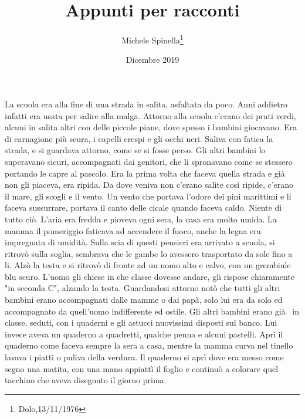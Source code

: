 \documentclass[12pt, a4paper]{article}
\author{Michele Spinella\thanks{Dolo,13/11/1976}}
\date{Dicembre 2019}
\title{Appunti per racconti}
\begin{document}
\ttfamily
\onehalfspacing


\section*{}
La scuola era alla fine di una strada in salita, asfaltata da poco. Anni addietro infatti era usata per salire alla malga. Attorno alla scuola c'erano dei prati verdi, alcuni in salita  altri con delle piccole piane, dove spesso i bambini giocavano.
Era di carnagione più scura, i capelli crespi e gli occhi neri. Saliva con fatica la strada, e si guardava attorno, come se si fosse perso. Gli altri bambini lo superavano sicuri, accompagnati dai genitori, che li spronavano  come se stessero portando le capre al pascolo.
Era la prima volta che faceva quella strada e già non gli piaceva, era ripida.
Da dove veniva non c'erano salite così ripide, c'erano il mare, gli scogli e il vento. Un vento che portava l'odore dei pini marittimi e li faceva sussurrare, portava il canto delle cicale quando faceva caldo.
Niente di tutto ciò. L'aria era fredda e pioveva ogni sera, la casa era molto umida. La mamma il pomeriggio faticava ad accendere il fuoco, anche la legna era impregnata di umidità.
\newline
Sulla scia di questi pensieri era arrivato a scuola, si ritrovò sulla soglia, sembrava che le gambe lo avessero trasportato da sole fino a li. Alzò la testa e si ritrovò di fronte ad un uomo alto e calvo, con un grembiule blu scuro. L'uomo gli chiese in che classe dovesse andare, gli rispose chiaramente "in seconda C", alzando la testa.
Guardandosi attorno notò che tutti gli altri bambini erano accompagnati dalle mamme o dai papà, solo lui era da solo ed accompagnato da quell'uomo indifferente ed ostile.\newline
Gli altri bambini erano già  in classe, seduti, con i quaderni e gli astucci nuovissimi disposti sul banco. Lui invece aveva un quaderno a quadretti, qualche penna e alcuni pastelli. Aprì il quaderno come faceva sempre la sera a casa, mentre la mamma curva nel tinello lavava i piatti o puliva della verdura. Il quaderno si aprì dove era messo come segno una matita,  con una mano appiattì il foglio e continuò a colorare quel tacchino che aveva disegnato il giorno prima.
\end{document}
